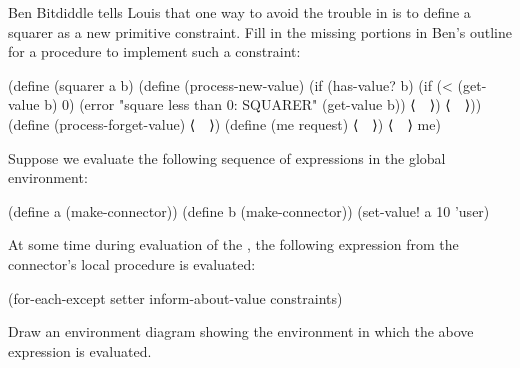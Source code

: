 \begin{exercise}
	\label{Exercise 3.35}
	Ben Bitdiddle tells Louis that one way to avoid the trouble in  is to define a squarer as a new primitive constraint.
	Fill in the missing portions in Ben’s outline for a procedure to implement such a constraint:
	\begin{scheme}
	  (define (squarer a b)
	    (define (process-new-value)
	      (if (has-value? b)
	          (if (< (get-value b) 0)
	              (error "square less than 0: SQUARER"
	                     (get-value b))
	              ⟨~~⟩)
	          ⟨~~⟩))
	    (define (process-forget-value) ⟨~~⟩)
	    (define (me request) ⟨~~⟩)
	    ⟨~~⟩
	    me)
	\end{scheme}
\end{exercise}



\begin{exercise}
	\label{Exercise 3.36}
	Suppose we evaluate the following sequence of expressions in the global environment:
	\begin{scheme}
	  (define a (make-connector))
	  (define b (make-connector))
	  (set-value! a 10 'user)
	\end{scheme}
	At some time during evaluation of the , the following expression from the connector’s local procedure is evaluated:
	\begin{scheme}
	  (for-each-except
	    setter inform-about-value constraints)
	\end{scheme}
	Draw an environment diagram showing the environment in which the above expression is evaluated.
\end{exercise}



